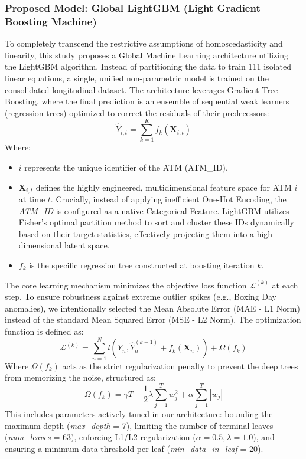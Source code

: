 \documentclass[conference, 12pt, onecolumn]{IEEEtran}
\begin{document}
\subsubsection{Proposed Model: Global LightGBM (Light Gradient Boosting Machine)}
To completely transcend the restrictive assumptions of homoscedasticity and linearity, this study proposes a Global Machine Learning architecture utilizing the LightGBM algorithm. Instead of partitioning the data to train 111 isolated linear equations, a single, unified non-parametric model is trained on the consolidated longitudinal dataset. The architecture leverages Gradient Tree Boosting, where the final prediction is an ensemble of sequential weak learners (regression trees) optimized to correct the residuals of their predecessors:
$$\hat{Y}_{i,t} = \sum_{k=1}^K f_k(\mathbf{X}_{i,t})$$
Where:
\begin{itemize}
    \item $i$ represents the unique identifier of the ATM (ATM\_ID).
    \item $\mathbf{X}_{i,t}$ defines the highly engineered, multidimensional feature space for ATM $i$ at time $t$. Crucially, instead of applying inefficient One-Hot Encoding, the \textit{ATM\_ID} is configured as a native Categorical Feature. LightGBM utilizes Fisher's optimal partition method to sort and cluster these IDs dynamically based on their target statistics, effectively projecting them into a high-dimensional latent space.
    \item $f_k$ is the specific regression tree constructed at boosting iteration $k$.
\end{itemize}
The core learning mechanism minimizes the objective loss function $\mathcal{L}^{(k)}$ at each step. To ensure robustness against extreme outlier spikes (e.g., Boxing Day anomalies), we intentionally selected the Mean Absolute Error (MAE - L1 Norm) instead of the standard Mean Squared Error (MSE - L2 Norm). The optimization function is defined as:
$$\mathcal{L}^{(k)} = \sum_{n=1}^N l\left(Y_n, \hat{Y}_n^{(k-1)} + f_k(\mathbf{X}_n)\right) + \Omega(f_k)$$
Where $\Omega(f_k)$ acts as the strict regularization penalty to prevent the deep trees from memorizing the noise, structured as:
$$\Omega(f_k) = \gamma T + \frac{1}{2} \lambda \sum_{j=1}^T w_j^2 + \alpha \sum_{j=1}^T |w_j|$$
This includes parameters actively tuned in our architecture: bounding the maximum depth (\textit{max\_depth} = 7), limiting the number of terminal leaves (\textit{num\_leaves} = 63), enforcing L1/L2 regularization ($\alpha = 0.5, \lambda = 1.0$), and ensuring a minimum data threshold per leaf (\textit{min\_data\_in\_leaf} = 20).
\end{document}

